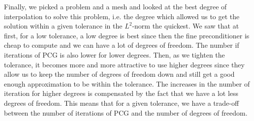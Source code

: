 Finally, we picked a problem and a mesh and looked at the best degree of interpolation to solve this problem, i.e. the degree which allowed us to get the solution within a given tolerance in the $L^2$-norm the quickest. We saw that at first, for a low tolerance, a low degree is best since then the fine preconditioner is cheap to compute and we can have a lot of degrees of freedom. The number if iterations of PCG is also lower for lower degrees. Then, as we tighten the tolerance, it becomes more and more attractive to use higher degrees since they allow us to keep the number of degrees of freedom down and still get a good enough approximation to be within the tolerance. The increases in the number of iteration for higher degrees is compensated by the fact that we have a lot less degrees of freedom. This means that for a given tolerance, we have a trade-off between the number of iterations of PCG and the number of degrees of freedom. 